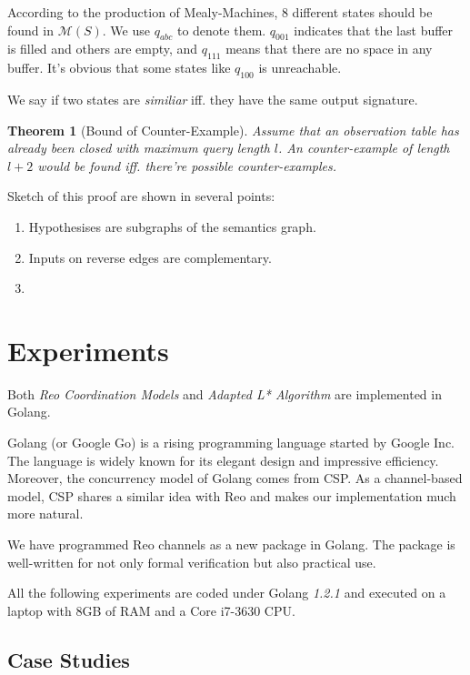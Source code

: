 \documentclass[conference, a4paper]{IEEEtran}
\newtheorem{theorem}{Theorem}
\begin{document}
According to the production of Mealy-Machines, 8 different states should be found in
$\mathcal{M}(S)$. We use $q_{abc}$ to denote them. $q_{001}$ indicates that the last buffer is
filled and others are empty, and $q_{111}$ means that there are no space in any buffer. It's
obvious that some states like $q_{100}$ is unreachable.

We say if two states are \emph{similiar} iff. they have the same output signature.

\begin{theorem}[Bound of Counter-Example]
  \label{the:cebound} Assume that an observation table has already been closed with maximum
  query length  $l$. An counter-example of length $l+2$ would be
  found iff. there're possible counter-examples.
\end{theorem}
\begin{IEEEproof}
  Sketch of this proof are shown in several points:
  \begin{enumerate}
    \item Hypothesises are subgraphs of the semantics graph.
    \item Inputs on reverse edges are complementary.
    \item 
  \end{enumerate}
\end{IEEEproof}

\section{Experiments}
Both \emph{Reo Coordination Models} and \emph{Adapted L* Algorithm} are implemented in
Golang\cite{golang}.

Golang (or Google Go) is a rising programming language started by Google Inc. The language is widely
known for its elegant design and impressive efficiency. Moreover, the concurrency model of Golang
comes from CSP\cite{DBLP:books/ph/Hoare85}. As a channel-based model, CSP shares a similar idea with
Reo and makes our implementation much more natural.

We have programmed Reo channels as a new package in Golang. The package is well-written for not only
formal verification but also practical use.

All the following experiments are coded under Golang \emph{1.2.1} and executed on a laptop with 8GB
of RAM and a Core i7-3630 CPU.

\subsection{Case Studies}
\end{document}
